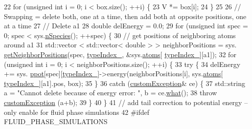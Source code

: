 \begin{DoxyCode}
22                 \textcolor{keywordflow}{for} (\textcolor{keywordtype}{unsigned} \textcolor{keywordtype}{int} i = 0; i < box.size(); ++i) \{
23         V *= box[i];
24     \}
25                     
26                 \textcolor{comment}{// Swapping = delete both, one at a time, then add both at opposite positions, one at a
       time}
27                 \textcolor{comment}{// Delete a1}
28     \textcolor{keywordtype}{double} delEnergy = 0.0;
29     \textcolor{keywordflow}{for} (\textcolor{keywordtype}{unsigned} \textcolor{keywordtype}{int} spec = 0; spec < sys.\hyperlink{classsim_system_ab5e2e9b6204de15520302fe1d51688dd}{nSpecies}(); ++spec) \{
30         \textcolor{comment}{// get positions of neighboring atoms around a1}
31         std::vector < std::vector< double > > neighborPositions = sys.
      \hyperlink{classsim_system_a7ac49b2311cd8230df8d078a9d897b35}{getNeighborPositions}(spec, \hyperlink{classmc_move_acb731965547b0326ef318ec96da8b46a}{typeIndex\_}, &sys.\hyperlink{classsim_system_a90421b19082f7fb8fc23b7264b1161e4}{atoms}[
      \hyperlink{classmc_move_acb731965547b0326ef318ec96da8b46a}{typeIndex\_}][a1]);
32         \textcolor{keywordflow}{for} (\textcolor{keywordtype}{unsigned} \textcolor{keywordtype}{int} i = 0; i < neighborPositions.size(); ++i) \{
33             \textcolor{keywordflow}{try} \{
34                                                                 delEnergy += sys.
      \hyperlink{classsim_system_a8d6271751a62f61edcf57f773540a4a3}{ppot}[spec][\hyperlink{classmc_move_acb731965547b0326ef318ec96da8b46a}{typeIndex\_}]->energy(neighborPositions[i], sys.\hyperlink{classsim_system_a90421b19082f7fb8fc23b7264b1161e4}{atoms}[
      \hyperlink{classmc_move_acb731965547b0326ef318ec96da8b46a}{typeIndex\_}][a1].pos, box);
35                                                 \}
36                                                 \textcolor{keywordflow}{catch} (\hyperlink{classcustom_exception}{customException}& ce) \{
37                                                                 std::string a = \textcolor{stringliteral}{"Cannot delete because of
       energy error: "}, b = ce.\hyperlink{classcustom_exception_aeb6ab5848b038adfc68fde86a512f691}{what}();
38                                                                 \textcolor{keywordflow}{throw} 
      \hyperlink{classcustom_exception}{customException} (a+b);
39                                                 \}
40         \}
41         \textcolor{comment}{// add tail correction to potential energy -- only enable for fluid phase simulations}
42 \textcolor{preprocessor}{#ifdef FLUID\_PHASE\_SIMULATIONS}

\end{DoxyCode}
